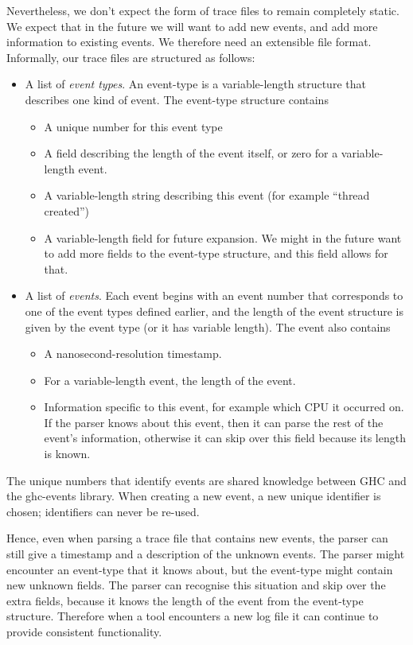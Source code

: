 \documentclass[twocolumn,9pt]{sigplanconf}
\newcommand{\codef}[1]{{\fontfamily{cmss}\small#1}}
\begin{document}
Nevertheless, we don't expect the form of trace files to remain
completely static.  We expect that in the future we will want to add
new events, and add more information to existing events.  We therefore
need an extensible file format.  Informally, our trace files are
structured as follows:

\begin{itemize}
\item A list of \emph{event types}.  An event-type is a
  variable-length structure that describes one kind of event.  The
  event-type structure contains
  \begin{itemize}
    \item A unique number for this event type
    \item A field describing the length of the event itself, or zero
      for a variable-length event.
    \item A variable-length string describing this event (for example
      ``thread created'')
    \item A variable-length field for future expansion.  We might in
      the future want to add more fields to the event-type structure,
      and this field allows for that.
  \end{itemize}
\item A list of \emph{events}.  Each event begins with an event number
  that corresponds to one of the event types defined earlier, and the
  length of the event structure is given by the event type (or it has
  variable length).  The event also contains
  \begin{itemize}
  \item A nanosecond-resolution timestamp.
  \item For a variable-length event, the length of the event.
  \item Information specific to this event, for example which CPU it
    occurred on.  If the parser knows about this event, then it can
    parse the rest of the event's information, otherwise it can skip
    over this field because its length is known.
  \end{itemize}
\end{itemize}

The unique numbers that identify events are shared knowledge between
GHC and the \codef{ghc-events} library.  When creating a new event, a new
unique identifier is chosen; identifiers can never be re-used.

Hence, even when parsing a trace file that contains new events, the
parser can still give a timestamp and a description of the unknown
events.  The parser might encounter an event-type that it knows about,
but the event-type might contain new unknown fields.  The parser can
recognise this situation and skip over the extra fields, because it
knows the length of the event from the event-type structure.
Therefore when a tool encounters a new log file it can continue to
provide consistent functionality.
\end{document}
